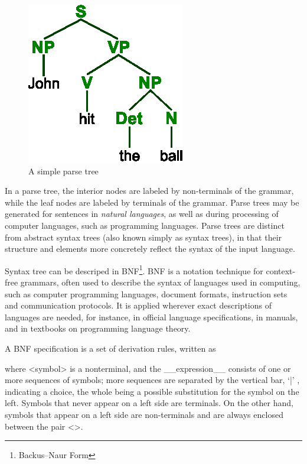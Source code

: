 \begin{figure}
\begin{center}
\includegraphics{../pictures/ParseTree}
\caption{A simple parse tree}
\end{center}\end{figure}In a parse tree,  the interior nodes are labeled by non-terminals of the grammar, while the leaf nodes are labeled by terminals of the grammar. Parse trees may be generated for sentences in {\em \mbox{natural} \mbox{languages}},  as well as during processing of computer languages, such as programming languages. Parse trees are \mbox{distinct} from abstract syntax trees (also known \mbox{simply} as syntax trees), in that their structure and \mbox{elements} more concretely reflect the syntax of the \mbox{input} language.

Syntax tree  can be descriped in BNF\footnote{Backus–Naur Form}.
BNF\cite{BNF} is a notation technique for context-free grammars, often used to describe the syntax of languages used in computing, such as computer programming languages, document formats, instruction sets and communication protocols. It is applied wherever exact descriptions of languages are needed, for instance, in official language specifications, in manuals, and in textbooks on programming language theory.

A BNF specification is a set of derivation rules, written as

where <symbol> is a nonterminal, and the \_\_expression\_\_ consists of one or more sequences of symbols; more sequences are separated by the vertical bar, `|' , indicating a choice, the whole being a possible substitution for the symbol on the left. Symbols that never appear on a left side are terminals. On the other hand, symbols that appear on a left side are non-terminals and are always enclosed between the pair <>.

